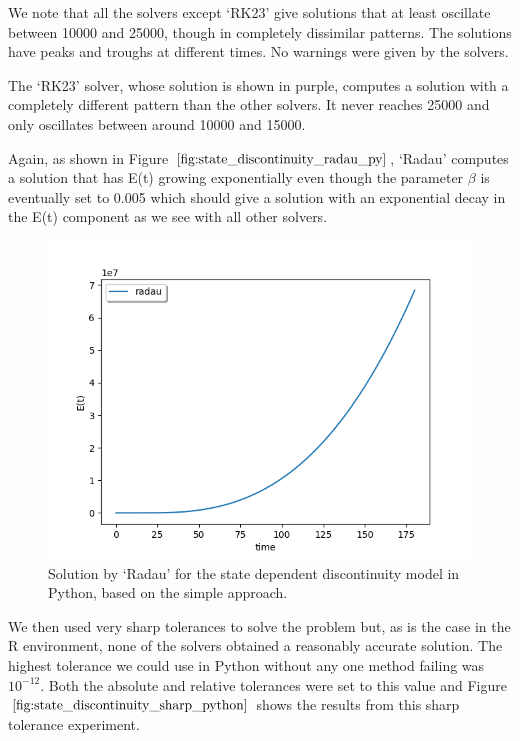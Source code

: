 We note that all the solvers except `RK23' give solutions that at least oscillate between 10000 and 25000, though in completely dissimilar patterns. The solutions have peaks and troughs at different times. No warnings were given by the solvers.

The `RK23' solver, whose solution is shown in purple, computes a solution with a completely different pattern than the other solvers. It never reaches 25000 and only oscillates between around 10000 and 15000. 

Again, as shown in Figure $\ref{fig:state_discontinuity_radau_py}$, `Radau' computes a solution that has E(t) growing exponentially even though the parameter $\beta$ is eventually set to 0.005 which should give a solution with an exponential decay in the E(t) component as we see with all other solvers.

\begin{figure}[h]
\centering
\includegraphics[width=0.7\linewidth]{./figures/state_discontinuity_radau_py}
\caption{Solution by `Radau' for the state dependent discontinuity model in Python, based on the simple approach.}
\label{fig:state_discontinuity_radau_py}
\end{figure}

We then used very sharp tolerances to solve the problem but, as is the case in the R environment, none of the solvers obtained a reasonably accurate solution. The highest tolerance we could use in Python without any one method failing was $10^{-12}$. Both the absolute and relative tolerances were set to this value and Figure $\ref{fig:state_discontinuity_sharp_python}$ shows the results from this sharp tolerance experiment.

